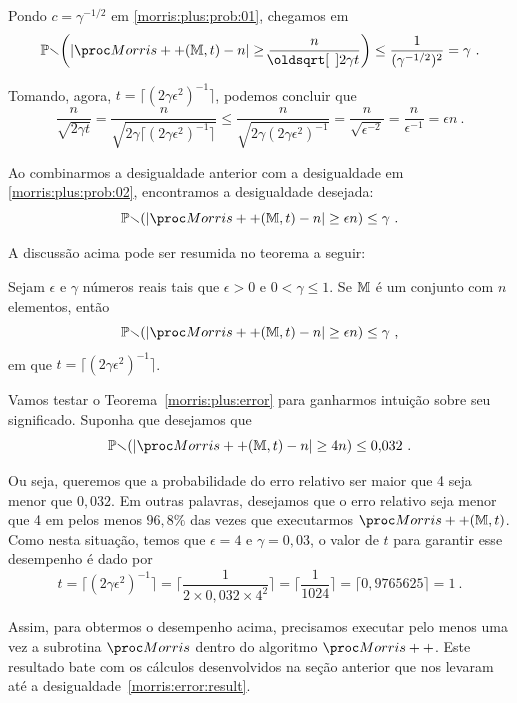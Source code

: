 Pondo $c = \gamma^{-1/2}$ em \eqref{morris:plus:prob:01}, chegamos em
\begin{align}
  \Pbb\bigg(|\Morrispp(\Mbb,t)-n| \geq \frac{n}{\sqrt{2\gamma t}}\bigg) \leq \frac{1}{(\gamma^{-1/2})^2} = \gamma \ . 
  \label{morris:plus:prob:02}
\end{align}

Tomando, agora, $t =\lceil (2\gamma\epsilon^2)^{-1} \rceil$, podemos concluir que
\[ \frac{n}{\sqrt{2\gamma t}} = \frac{n}{\sqrt{2\gamma \lceil (2\gamma\epsilon^2)^{-1} \rceil}} \leq 
\frac{n}{\sqrt{2\gamma(2\gamma\epsilon^2)^{-1}}} = \frac{n}{\sqrt{\epsilon^{-2}}} = \frac{n}{\epsilon^{-1}} = 
\epsilon n \ . \] 

Ao combinarmos a desigualdade anterior com a desigualdade em \eqref{morris:plus:prob:02}, encontramos a desigualdade
desejada:
\[ \Pbb(|\Morrispp(\Mbb,t)-n| \geq \epsilon n) \leq \gamma \ . \]

A discussão acima pode ser resumida no teorema a seguir:
\begin{theorem}
  \label{morris:plus:error}
  Sejam $\epsilon$ e $\gamma$ números reais tais que $\epsilon > 0$ e $0 < \gamma \leq 1$. Se $\mathbb{M}$ é um conjunto com 
  $n$ elementos, então
  \[ \Pbb(|\Morrispp(\Mbb,t)-n| \geq \epsilon n) \leq \gamma \ , \]
  em que $t =\lceil (2\gamma\epsilon^2)^{-1} \rceil$.
\end{theorem}

Vamos testar o Teorema~\eqref{morris:plus:error} para ganharmos intuição sobre seu significado. Suponha que desejamos
que
\[ \Pbb(|\Morrispp(\Mbb, t) - n| \geq 4n) \leq 0{,}032 \ . \]

Ou seja, queremos que a probabilidade do erro relativo ser maior que 4 seja menor que $0{,}032$. Em outras palavras, 
desejamos que o erro relativo seja menor que 4 em pelos menos $96{,}8\%$ das vezes que executarmos $\Morrispp(\Mbb, t)$.
Como nesta situação, temos que $\epsilon = 4$ e $\gamma = 0{,}03$, o valor de $t$ para garantir esse desempenho é dado 
por
\[ t = \lceil (2\gamma\epsilon^2)^{-1}\rceil = \bigg\lceil \frac{1}{2 \times 0{,}032 \times 4^2}\bigg\rceil = 
\bigg\lceil \frac{1}{1024} \bigg\rceil = \lceil 0{,}9765625 \rceil = 1 \ . \]

Assim, para obtermos o desempenho acima, precisamos executar pelo menos uma vez a subrotina $\Morris$ dentro do 
algoritmo $\Morrispp$. Este resultado bate com os cálculos desenvolvidos na seção anterior que nos levaram até a 
desigualdade~\eqref{morris:error:result}.

